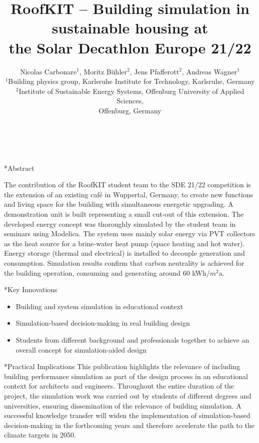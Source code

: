 \documentclass[twocolumn, a4paper,10pt]{article}
\title{%
RoofKIT – Building simulation in sustainable housing at \\%
\vspace{4pt}
the Solar Decathlon Europe 21/22} %
\author{%
Nicolas Carbonare$^1$, Moritz Bühler$^2$, Jens Pfafferott$^2$, Andreas Wagner$^1$\\ %
$^1$Building physics group, Karlsruhe Institute for Technology, Karlsruhe, Germany\\ %
$^2$Institute of Sustainable Energy Systems, Offenburg University of Applied Sciences,\\%
Offenburg, Germany\\ %
\phantom{Line 8}\\ %
\phantom{Line 9}\\} %
\date{\vspace{-0.5cm}}	%
\makeatletter
\renewcommand\section{\@startsection{section}{1}{\z@}{3pt}{3pt}{\normalfont\large\bfseries}}
\makeatother
\begin{document}
\maketitle
\section*{Abstract}	%
\addtocounter{section}{1}
The contribution of the RoofKIT student team to the SDE 21/22 competition is the extension of an existing café in Wuppertal, Germany, to create new functions and living space for the building with simultaneous energetic upgrading. A demonstration unit is built representing a small cut-out of this extension. The developed energy concept was thoroughly simulated by the student team in seminars using Modelica. The system uses mainly solar energy via PVT collectors as the heat source for a brine-water heat pump (space heating and hot water). Energy storage (thermal and electrical) is installed to decouple generation and consumption. Simulation results confirm that carbon neutrality is achieved for the building operation, consuming and generating around 60 kWh/$m^2$a.

\section*{Key Innovations}
\begin{itemize}
\item Building and system simulation in educational context
\item Simulation-based decision-making in real building design
\item Students from different background and professionals together to achieve an overall concept for simulation-aided design
\end{itemize}

\section*{Practical Implications}
This publication highlights the relevance of including building performance simulation as part of the design process in an educational context for architects and engineers. Throughout the entire duration of the project, the simulation work was carried out by students of different degrees and universities, ensuring dissemination of the relevance of building simulation. A successful knowledge transfer will widen the implementation of simulation-based decision-making in the forthcoming years and therefore accelerate the path to the climate targets in 2050.  
\end{document}
